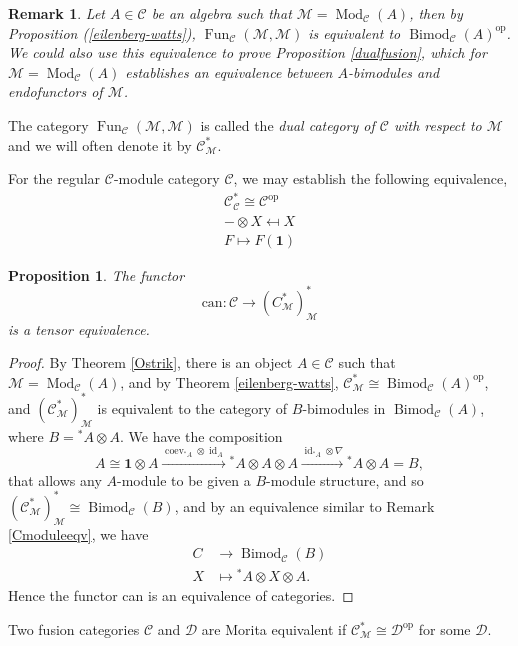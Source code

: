 \documentclass[a4paper, 10pt]{book}
\newtheorem{Prop}[theorem]{Proposition}
\newtheorem{Rem}[theorem]{Remark}
\theoremstyle{definition}
\numberwithin{equation}{chapter}
\newcommand\id{\operatorname{id}}
\newcommand\ot{\otimes}
\newcommand\Bimod{\operatorname{Bimod}}
\newcommand\Fun{\operatorname{Fun}}
\newcommand\Hom{\operatorname{Hom}}
\newcommand\Mod{\operatorname{Mod}}
\newcommand\op{^{\text{op}}}
\newcommand\M{\mathcal{M}}
\newcommand\C{\mathcal C}
\newcommand\D{\mathcal D}
\newcommand{\ra}\rightarrow
\newcommand{\xra}\xrightarrow
\newcommand\one{\mathbf{1}}
\newcommand\coev{\operatorname{coev}}
\begin{document}
\begin{Rem}\rm
Let $A\in \C$ be an algebra such that $\M = \Mod_\C(A)$, then by Proposition (\ref{eilenberg-watts}),  $\Fun_\C(\M, \M)$ is equivalent to $\Bimod_\C(A)\op$. We could also use this equivalence to prove Proposition \ref{dualfusion}, which for $\M=\Mod_\C(A)$ establishes an equivalence between $A$-bimodules and endofunctors of $\M$.
\end{Rem}
The category $\Fun_\C(\M, \M)$ is called the \textit{dual category of $\C$ with respect to $\M$} and we will often denote it by $\C^*_\M$. 

For the regular $\C$-module category $\C$, we may establish the following equivalence, 
\begin{align}
	\C^*_\C\cong \C\op\\
	- \ot X \mapsfrom X\\
	F \mapsto F(\one)
\end{align} 
\begin{Prop}
The functor \begin{equation}\label{can}
	\mathrm{can} : \C \ra (C^*_\M)^*_\M
\end{equation} is a tensor equivalence.
\end{Prop}
\begin{proof}
By Theorem \ref{Ostrik}, there is an object $A\in \C$ such that $\M =\Mod_\C(A)$, and by Theorem \ref{eilenberg-watts}, $\C^*_\M \cong \Bimod_\C(A)\op$, and $(\C^*_\M)^*_\M$ is equivalent to the category of $B$-bimodules in $\Bimod_\C(A)$, where $B={}^*A \ot A$.
We have the composition \begin{equation}
	A\cong \one \ot A \xra{\coev_{{}^*A}\ot \id_A} {}^*A \ot A \ot A \xra{\id_{{}^* A}\ot \nabla} {}^*A \ot A = B,
\end{equation} that allows any $A$-module to be given a $B$-module structure, and so $(\C^*_\M)^*_\M \cong \Bimod_\C(B)$, and by an equivalence similar to Remark \ref{Cmoduleeqv}, we have \begin{align}
	C&\ra \Bimod_\C(B)\\
	X &\mapsto {}^*A \ot X \ot A.
\end{align}
Hence the functor can is an equivalence of categories.
\end{proof}
Two fusion categories $\C$ and $\D$ are Morita equivalent if $\C^*_\M \cong \D\op$ for some $\D$. 
\end{document}
